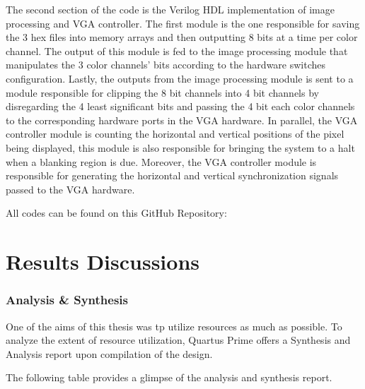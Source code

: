 \par The second section of the code is the Verilog HDL implementation of image processing and VGA controller. The first module is the one responsible for saving the 3 hex files into memory arrays and then outputting 8 bits at a time per color channel. The output of this module is fed to the image processing module that manipulates the 3 color channels' bits according to the hardware switches configuration. Lastly, the outputs from the image processing module is sent to a module responsible for clipping the 8 bit channels into 4 bit channels by disregarding the 4 least significant bits and passing the 4 bit each color channels to the corresponding hardware ports in the VGA hardware. In parallel, the VGA controller module is counting the horizontal and vertical positions of the pixel being displayed, this module is also responsible for bringing the system to a halt when a blanking region is due. Moreover, the VGA controller module is responsible for generating the horizontal and vertical synchronization signals passed to the VGA hardware. \newline
\par All codes can be found on this GitHub Repository: \cite{fpgaipvgarepo} \newline
\section{Results Discussions}

\subsubsection{Analysis \& Synthesis}
\par One of the aims of this thesis was tp utilize resources as much as possible. To analyze the extent of resource utilization, Quartus Prime offers a Synthesis and Analysis report upon compilation of the design. \newline
\par The following table provides a glimpse of the analysis and synthesis report. \newline

